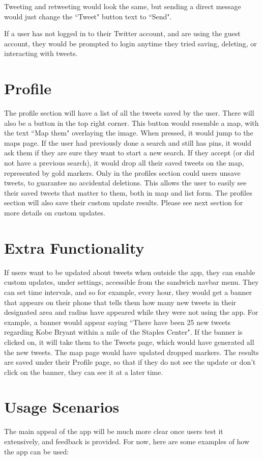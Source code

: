 \documentclass[11pt]{article}
\begin{document}
Tweeting and retweeting would look the same, but sending a direct message would just change the ``Tweet" button text to ``Send".

If a user has not logged in to their Twitter account, and are using the guest account, they would be prompted to login anytime they tried saving, deleting, or interacting with tweets.

\section{Profile}
The profile section will have a list of all the tweets saved by the user. There will also be a button in the top right corner. This button would resemble a map, with the text ``Map them" overlaying the image. When pressed, it would jump to the maps page. If the user had previously done a search and still has pins, it would ask them if they are sure they want to start a new search. If they accept (or did not have a previous search), it would drop all their saved tweets on the map, represented by gold markers. Only in the profiles section could users unsave tweets, to guarantee no accidental deletions. This allows the user to easily see their saved tweets that matter to them, both in map and list form. The profiles section will also save their custom update results. Please see next section for more details on custom updates.

\section{Extra Functionality}
If users want to be updated about tweets when outside the app, they can enable custom updates, under settings, accessible from the sandwich navbar menu. They can set time intervals, and so for example, every hour, they would get a banner that appears on their phone that tells them how many new tweets in their designated area and radius have appeared while they were not using the app. For example, a banner would appear saying ``There have been 25 new tweets regarding Kobe Bryant within a mile of the Staples Center". If the banner is clicked on, it will take them to the Tweets page, which would have generated all the new tweets. The map page would have updated dropped markers. The results are saved under their Profile page, so that if they do not see the update or don't click on the banner, they can see it at a later time.

\section{Usage Scenarios}
The main appeal of the app will be much more clear once users test it extensively, and feedback is provided. For now, here are some examples of how the app can be used:
\end{document}
